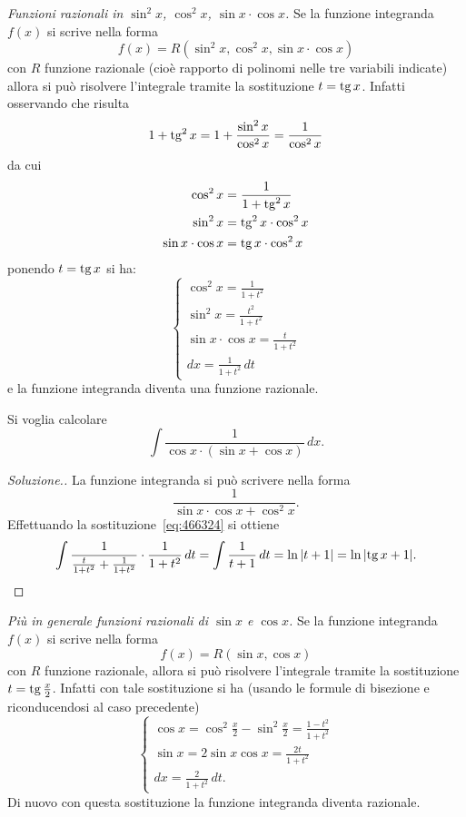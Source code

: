 \emph{Funzioni razionali in $\sin^2 x$, $\cos^2 x$, $\sin x \cdot \cos x$.}
Se la funzione integranda $f(x)$ si scrive nella forma
\[
  f(x) = R(\sin^2 x, \cos^2 x, \sin x \cdot \cos x)
\]
con $R$ funzione razionale (cioè rapporto di polinomi nelle tre variabili indicate)
 allora si può risolvere l'integrale
tramite la sostituzione $t=\operatorname{tg} x$. Infatti
osservando che risulta
\[
  1 + \operatorname{tg}^2 x = 1 + \frac{\sin^2 x}{\cos^2 x} = \frac{1}{\cos^2 x}
\]
da cui
\begin{align*}
\cos^2 x &= \frac{1}{1+\operatorname{tg}^2 x}\\
\sin^2 x &= \operatorname{tg}^2 x \cdot\cos^2 x\\
\sin x \cdot \cos x &= \operatorname{tg} x \cdot \cos^2 x
\end{align*}
ponendo $t = \operatorname{tg} x$ si ha:
\begin{equation}\label{eq:466324}
\begin{cases}
  \cos^2 x = \frac{1}{1+t^2}\\
  \sin^2 x = \frac{t^2}{1+t^2}\\
  \sin x \cdot \cos x = \frac{t}{1+t^2}\\
  dx = \frac{1}{1+t^2}\, dt
\end{cases}
\end{equation}
e la funzione integranda diventa una funzione razionale.

\begin{example}
\label{ex:35663}
Si voglia calcolare
\[
  \int \frac{1}{\cos x \cdot ( \sin x + \cos x)}\, dx.
\]
\end{example}
\begin{proof}[Soluzione.]
La funzione integranda si può scrivere nella forma
\[
  \frac{1}{\sin x \cdot \cos x + \cos^2x}.
\]
Effettuando la sostituzione~\eqref{eq:466324}
si ottiene
\[
  \int \frac{1}{\frac t {1+t^2} + \frac{1}{1+t^2}}\cdot \frac{1}{1+t^2}\, dt
  = \int \frac{1}{t+1}\, dt = \ln {\left|t+1\right|} = \ln {\left|\operatorname{tg}x + 1\right|}.
\]
\end{proof}

\emph{Più in generale funzioni razionali di $\sin x$ e $\cos x$.}
Se la funzione integranda $f(x)$ si scrive nella forma
\[
  f(x) = R(\sin x, \cos x)
\]
con $R$ funzione razionale, allora si può risolvere l'integrale
tramite la sostituzione $t=\operatorname{tg} \frac{x}{2}$. Infatti con tale sostituzione si ha
(usando le formule di bisezione e riconducendosi al caso precedente)
\begin{equation}\label{eq:3675323}
  \begin{cases}
    \cos x = \cos^2 \frac x 2 - \sin^2 \frac x 2 = \frac{1-t^2}{1+t^2} \\
    \sin x = 2 \sin x \cos x = \frac{2t}{1+t^2}\\
    dx = \frac{2}{1+t^2}\, dt.
  \end{cases}
\end{equation}
Di nuovo con questa sostituzione la funzione integranda diventa razionale.

